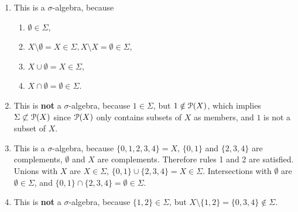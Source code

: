 \begin{enumerate}
    \item This is a \(\sigma\)-algebra, because
    \begin{enumerate}
        \item \(\emptyset \in \Sigma\),
        \item \(X \setminus \emptyset = X \in \Sigma, X \setminus X = \emptyset \in \Sigma\),
        \item \(X \cup \emptyset = X \in \Sigma\),
        \item \(X \cap \emptyset = \emptyset \in \Sigma\).
    \end{enumerate}
    \item This is \textbf{not} a \(\sigma\)-algebra, because \(1 \in \Sigma\), but \(1 \notin \mathcal{P}(X)\), which implies \(\Sigma \not\subset \mathcal{P}(X)\) since \(\mathcal{P}(X)\) only contains subsets of \(X\) as members, and \(1\) is not a subset of \(X\).
    \item This is a \(\sigma\)-algebra, because \(\{0, 1, 2, 3, 4\} = X\), \(\{0, 1\}\) and \(\{2, 3, 4\}\) are complements, \(\emptyset\) and \(X\) are complements. Therefore rules 1 and 2 are satisfied.
    Unions with \(X\) are \(X \in \Sigma\), \(\{0, 1\} \cup \{2, 3, 4\} = X \in \Sigma\). Intersections with \(\emptyset\) are \(\emptyset \in \Sigma\), and \(\{0, 1\} \cap \{2, 3, 4\} = \emptyset \in \Sigma\).
    \item This is \textbf{not} a \(\sigma\)-algebra, because \(\{1, 2\} \in \Sigma\), but \(X \setminus \{1, 2\} = \{0, 3, 4\} \notin \Sigma\).
\end{enumerate}